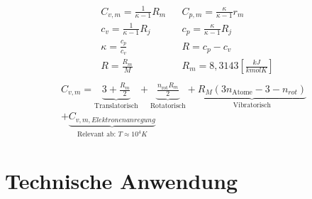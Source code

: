 \documentclass[twocolumn]{article}
\begin{document}
\begin{align*}
	&	C_{v,m} = \frac{1}{\kappa - 1} R_m
		&&C_{p,m} = \frac{\kappa}{\kappa -1}r_m \\
	&	c_v = \frac{1}{\kappa - 1 }R_j 
		&&c_p = \frac{\kappa}{\kappa -1}R_j \\
	&	\kappa = \frac{c_p}{c_v}
	&&R = c_p - c_v \\
	&R = \frac{R_m}{M}
	&&R_m = 8,3143\left[\frac{kJ}{kmolK}\right] \\
	\end{align*}
	\begin{multline*}
		C_{v,m} = \underbrace{3 + \frac{R_m}{2}}_{\text{Translatorisch}} + \underbrace{\frac{n_{\text{rot}}  R_m}{2}}_{\text{Rotatorisch}}  
		+ \underbrace{R_M ( 3n_{\text{Atome}} - 3 - n_{rot})}_{\text{Vibratorisch}}  \\
		+ \underbrace{C_{v,m,Elektronenanregung}}_{\text{Relevant ab: }T \approx 10^4K } 
	\end{multline*}
%                                                         

\onecolumn
\section{Technische Anwendung}
\end{document}
